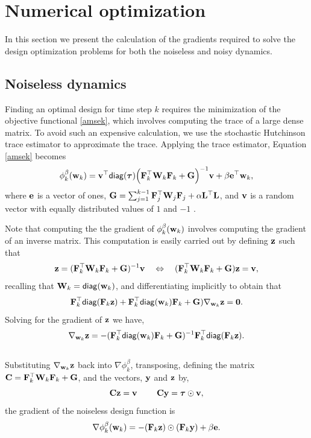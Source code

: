 \documentclass[11pt]{article}
\newcommand{\bfC}	{{\bf{C}}}
\newcommand{\bfF}	{{\bf{F}}}
\newcommand{\bfG}	{{\bf{G}}}
\newcommand{\bfL}	{{\bf{L}}}
\newcommand{\bfW}	{{\bf{W}}}
\newcommand{\bfe}	{{\bf{e}}}
\newcommand{\bfv}	{{\bf{v}}}
\newcommand{\bfw}	{{\bf{w}}}
\newcommand{\bfy}	{{\bf{y}}}
\newcommand{\bfz}	{{\bf{z}}}
\newcommand{\bftau}      {{\boldsymbol \tau}}
\newcommand{\LtL}       { \bfL^{\top}\bfL}
\newcommand {\zero}  { {\bf 0} }
\newcommand{\grad}	{\ensuremath {{\bf{ \nabla}}}}
\begin{document}
\section{Numerical optimization}
\label{sec:Opt}
In this section we present the calculation of the gradients required to solve the design optimization problems for both the noiseless and noisy dynamics. 
\subsection{Noiseless dynamics}
Finding an optimal design for  time step $k$ requires the minimization of the objective functional \eqref{amsek}, which involves computing the trace of a large dense matrix. To avoid such an expensive calculation, we use the stochastic Hutchinson trace estimator to approximate the trace. Applying the trace estimator, Equation \eqref{amsek} becomes
\begin{equation*}
\phi_k^{\beta}(\bfw_k) = \bfv^{\top}{\sf diag}(\bftau) \Big(\bfF_k^{\top}\bfW_k\bfF_k   + \bfG \Big)^{-1}\bfv + \beta\bfe^{\top}\bfw_k,
\end{equation*}
where $\bfe$ is a vector of ones, $\bfG = \sum_{j=1}^{k-1}\bfF_{j}^{\top}\bfW_{j}\bfF_{j}+ \alpha\LtL$, and $\bfv$ is a random vector with equally distributed values of $1$ and $-1$ \cite{Hutchinson1990,Haber2011}. 


Note that computing the the gradient of $\phi_k^{\beta}(\bfw_k)$ involves computing the gradient of an inverse matrix.
This computation is easily carried out by defining $\bfz$ such that
\begin{equation}
\label{eq:z}
\bfz = (\bfF_k^{\top}\bfW_k\bfF_k   + \bfG)^{-1}\bfv \quad \Leftrightarrow \quad
(\bfF_k^{\top}\bfW_k\bfF_k   + \bfG)\bfz = \bfv,
\end{equation}
  recalling that $\bfW_k = {\sf diag}(\bfw_k)$, and differentiating implicitly to obtain that
\begin{equation*}
\bfF_k^{\top}{\sf diag}(\bfF_k\bfz) + \bfF_k^{\top}{\sf diag}(\bfw_k)\bfF_k +\bfG)\grad_{\bfw_k}\bfz =\zero.
\end{equation*}
Solving for the gradient of $\bfz$ we have,
\begin{equation*}
\nabla_{\bfw_k}\bfz = -(\bfF_k^{\top}{\sf diag}(\bfw_k)\bfF_k +\bfG)^{-1} \bfF_k^{\top}{\sf diag}(\bfF_k\bfz).
\end{equation*}
\\
Substituting $\nabla_{\bfw_k}\bfz$ back into $\nabla\phi_k^{\beta}$, transposing, defining the matrix $\bfC = \bfF_k^{\top}\bfW_k\bfF_k   + \bfG$, and the vectors, $\bfy$ and $\bfz$ by, 
$$\bfC\bfz = \bfv\ \quad \quad \bfC\bfy =\bftau\odot\bfv, $$ 
the gradient of the noiseless design function is
\begin{equation}
\nabla\phi_k^{\beta}(\bfw_k) =  -(\bfF_k\bfz)\odot(\bfF_k\bfy) + \beta\bfe.
\end{equation}
\end{document}
